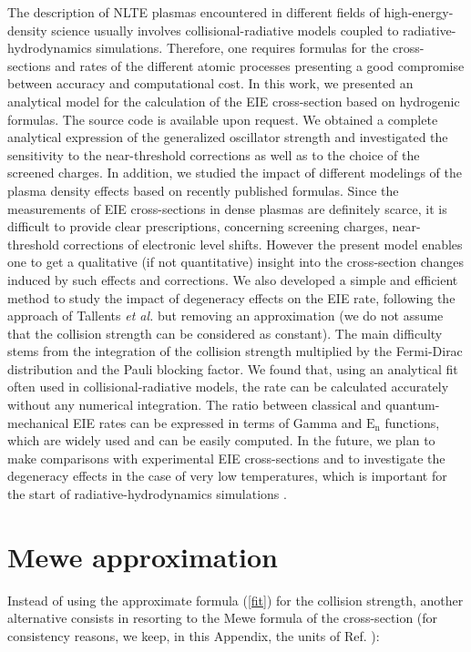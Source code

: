 \documentclass[a4paper,10pt]{article}
\begin{document}
The description of NLTE plasmas encountered in different fields of high-energy-density science usually involves collisional-radiative models coupled to radiative-hydrodynamics simulations. Therefore, one requires formulas for the cross-sections and rates of the different atomic processes presenting a good compromise between accuracy and computational cost. In this work, we presented an analytical model for the calculation of the EIE cross-section based on hydrogenic formulas. The source code is available upon request. We obtained a complete analytical expression of the generalized oscillator strength and investigated the sensitivity to the near-threshold corrections as well as to the choice of the screened charges. In addition, we studied the impact of different modelings of the plasma density effects based on recently published formulas. Since the measurements of EIE cross-sections in dense plasmas are definitely scarce, it is difficult to provide clear prescriptions, concerning screening charges, near-threshold corrections of electronic level shifts. However the present model enables one to get a qualitative (if not quantitative) insight into the cross-section changes induced by such effects and corrections. We also developed a simple and efficient method to study the impact of degeneracy effects on the EIE rate, following the approach of Tallents \textit{et al.} but removing an approximation (we do not assume that the collision strength can be considered as constant). The main difficulty stems from the integration of the collision strength multiplied by the Fermi-Dirac distribution and the Pauli blocking factor. We found that, using an analytical fit often used in collisional-radiative models, the rate can be calculated accurately without any numerical integration. The ratio between classical and quantum-mechanical EIE rates can be expressed in terms of Gamma and $\mathrm{E_n}$ functions, which are widely used and can be easily computed. In the future, we plan to make comparisons with experimental EIE cross-sections and to investigate the degeneracy effects in the case of very low temperatures, which is important for the start of radiative-hydrodynamics simulations \cite{DESCHAUD14}.

\appendix

\section{Mewe approximation}\label{meweapp}

Instead of using the approximate formula (\ref{fit}) for the collision strength, another alternative consists in resorting to the Mewe formula \cite{mewe72} of the cross-section (for consistency reasons, we keep, in this Appendix, the units of Ref. \cite{faussurier09}):
\end{document}
